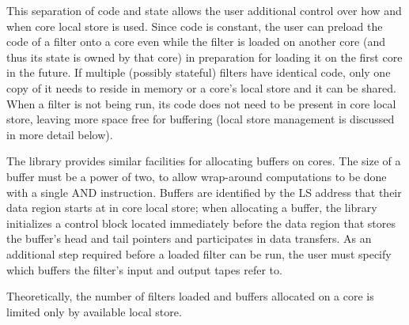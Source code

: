 This separation of code and state allows the user additional control
over how and when core local store is used. Since code is constant,
the user can preload the code of a filter onto a core even while the
filter is loaded on another core (and thus its state is owned by that
core) in preparation for loading it on the first core in the
future. If multiple (possibly stateful) filters have identical code,
only one copy of it needs to reside in memory or a core's local store
and it can be shared. When a filter is not being run, its code does
not need to be present in core local store, leaving more space free
for buffering (local store management is discussed in more detail
below).

The library provides similar facilities for allocating buffers on
cores. The size of a buffer must be a power of two, to allow
wrap-around computations to be done with a single \textsf{AND}
instruction. Buffers are identified by the LS address that their data
region starts at in core local store; when allocating a buffer, the
library initializes a control block located immediately before the
data region that stores the buffer's head and tail pointers and
participates in data transfers. As an additional step required before
a loaded filter can be run, the user must specify which buffers the
filter's input and output tapes refer to.


Theoretically, the number of filters loaded and buffers allocated on a
core is limited only by available local store.

